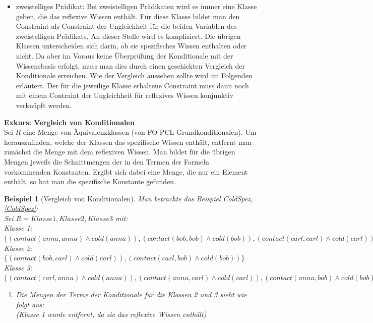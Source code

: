 \documentclass[a4paper, 11pt]{book}
\newtheorem{Bsp}{Beispiel}[section]
\begin{document}
{\begin{itemize}
\begin{itemize}
		\item zweistelliges Prädikat: Bei zweistelligen Prädikaten wird es immer eine Klasse geben, die das reflexive Wissen enthält. Für diese Klasse bildet man den Constraint als Constraint der Ungleichheit für die beiden Variablen des zweistelligen Prädikats. An dieser Stelle wird es kompliziert. Die übrigen Klassen unterscheiden sich darin, ob sie spezifisches Wissen enthalten oder nicht. Da aber im Voraus keine Überprüfung der Konditionale mit der Wissensbasis erfolgt, muss man dies durch einen geschickten Vergleich der Konditionale erreichen. Wie der Vergleich aussehen sollte wird im Folgenden erläutert. Der für die jeweilige Klasse erhaltene Constraint muss dann noch mit einem Contraint der Ungleichheit für reflexives Wissen konjunktiv verknüpft werden. 
		\end{itemize}
	\textbf{Exkurs: Vergleich von Konditionalen} \label{Vergleich von Konditionalen}  \\
	Sei $ R $ eine Menge von Äquivalenzklassen (von FO-PCL Grundkonditionalen). Um herauszufinden, welche der Klassen das  spezifische Wissen enthält, entfernt man zunächst die Menge mit dem reflexiven Wissen. Man bildet für die übrigen Mengen jeweils die Schnittmengen der in den Termen der Formeln vorkommenden Konstanten. Ergibt sich dabei eine Menge, die nur ein Element enthält, so hat man die spezifische Konstante gefunden. 
	\begin{Bsp}[Vergleich von Konditionalen]
		Man betrachte das Beispiel ColdSpez, \ref{ColdSpez}:\\
		Sei $ R = {Klasse 1, Klasse 2, Klasse 3} $ mit:\\
		Klasse 1: $ \{(contact(anna,anna) \land cold(anna)), (contact(bob,bob) \land cold(bob)), (contact(carl,carl) \land cold(carl)) \} $\\
		Klasse 2: $ \{(contact(bob,carl) \land cold(carl)), (contact(carl,bob) \land cold(bob)) \} $\\
		Klasse 3: $ \{(contact(carl,anna) \land cold(anna)), (contact(anna, carl) \land cold(carl)), (contact(anna,bob) \land cold(bob)), (contact(bob, anna) \land cold(anna)) \} $\\
 		\begin{enumerate}
 			\item Die Mengen der Terme der Konditionale für die Klassen 2 und 3 sieht wie folgt aus:\\
 			(Klasse 1 wurde entfernt, da sie das reflexive Wissen enthält)\\

\end{enumerate}
\end{Bsp}
\end{itemize}}
\end{document}
